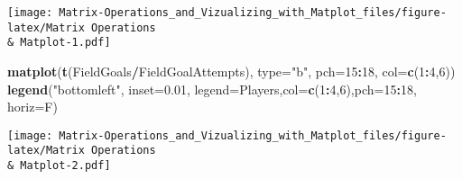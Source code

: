 \documentclass[
]{article}
\newenvironment{Shaded}{\begin{snugshade}}{\end{snugshade}}
\newcommand{\DataTypeTok}[1]{\textcolor[rgb]{0.13,0.29,0.53}{#1}}
\newcommand{\DecValTok}[1]{\textcolor[rgb]{0.00,0.00,0.81}{#1}}
\newcommand{\FloatTok}[1]{\textcolor[rgb]{0.00,0.00,0.81}{#1}}
\newcommand{\KeywordTok}[1]{\textcolor[rgb]{0.13,0.29,0.53}{\textbf{#1}}}
\newcommand{\NormalTok}[1]{#1}
\newcommand{\OperatorTok}[1]{\textcolor[rgb]{0.81,0.36,0.00}{\textbf{#1}}}
\newcommand{\StringTok}[1]{\textcolor[rgb]{0.31,0.60,0.02}{#1}}
\begin{document}
\texttt{[image: Matrix-Operations\_and\_Vizualizing\_with\_Matplot\_files/figure-latex/Matrix Operations \\\& Matplot-1.pdf]}

\begin{Shaded}
\begin{Highlighting}[]
\KeywordTok{matplot}\NormalTok{(}\KeywordTok{t}\NormalTok{(FieldGoals}\OperatorTok{/}\NormalTok{FieldGoalAttempts), }\DataTypeTok{type=}\StringTok{"b"}\NormalTok{, }\DataTypeTok{pch=}\DecValTok{15}\OperatorTok{:}\DecValTok{18}\NormalTok{, }\DataTypeTok{col=}\KeywordTok{c}\NormalTok{(}\DecValTok{1}\OperatorTok{:}\DecValTok{4}\NormalTok{,}\DecValTok{6}\NormalTok{))}
\KeywordTok{legend}\NormalTok{(}\StringTok{"bottomleft"}\NormalTok{, }\DataTypeTok{inset=}\FloatTok{0.01}\NormalTok{, }\DataTypeTok{legend=}\NormalTok{Players,}\DataTypeTok{col=}\KeywordTok{c}\NormalTok{(}\DecValTok{1}\OperatorTok{:}\DecValTok{4}\NormalTok{,}\DecValTok{6}\NormalTok{),}\DataTypeTok{pch=}\DecValTok{15}\OperatorTok{:}\DecValTok{18}\NormalTok{, }\DataTypeTok{horiz=}\NormalTok{F)        }
\end{Highlighting}
\end{Shaded}

\texttt{[image: Matrix-Operations\_and\_Vizualizing\_with\_Matplot\_files/figure-latex/Matrix Operations \\\& Matplot-2.pdf]}
\end{document}
